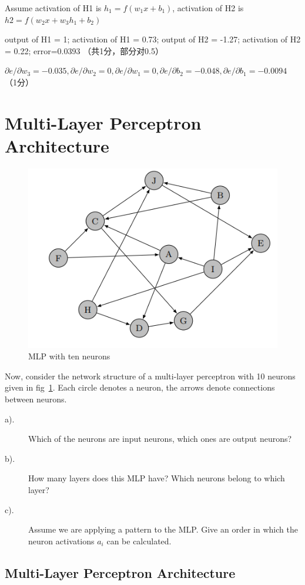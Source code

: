 \documentclass[12pt]{article}
\begin{document}
Assume activation of H1 is $h_1=f(w_1x+b_1)$, activation of H2 is $h2=f(w_2x+w_3 h_1+b_2)$

output of H1 = 1; activation of H1 = 0.73; output of H2 = -1.27; activation of H2 = 0.22; 	error=0.0393 （共1分，部分对0.5）

$\partial e/\partial w_3 = -0.035, \partial e/\partial w_2 = 0, \partial e/\partial w_1 = 0, \partial e / \partial b_2 = -0.048, \partial e / \partial b_1 =   -0.0094$
（1分）

\newpage
\section{Multi-Layer Perceptron Architecture}

\begin{figure}[!htbp]
	\centering
	\includegraphics[width=.55\textwidth]{fig/2018-03-19-13-54-31.png}
	\caption{MLP with ten neurons} \label{fig:mlp2}
\end{figure}

Now, consider the network structure of a multi-layer perceptron with 10 neurons given in
fig~\ref{fig:mlp2}. Each circle denotes a neuron, the arrows denote connections between neurons.
\begin{description}
	\item[a).]  Which of the neurons are input neurons, which ones are output neurons?
	\item[b).] How many layers does this MLP have? Which neurons belong to which layer?
	\item[c).] Assume we are applying a pattern to the MLP. Give an order in which the neuron
	      activations $a_i$ can be calculated.
\end{description}

\subsection{Multi-Layer Perceptron Architecture}
\end{document}
